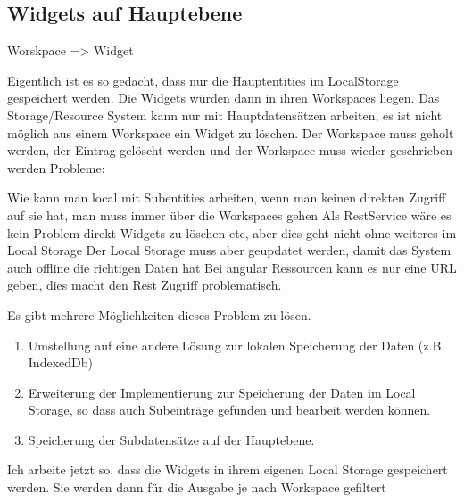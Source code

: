 \subsection{Widgets auf Hauptebene}

Worskpace => Widget

Eigentlich ist es so gedacht, dass nur die Hauptentities im LocalStorage gespeichert werden.
Die Widgets würden dann in ihren Workspaces liegen. Das Storage/Resource System kann nur mit Hauptdatensätzen arbeiten, es ist nicht möglich aus einem Workspace ein Widget zu löschen. Der Workspace muss geholt werden, der Eintrag gelöscht werden und der Workspace muss wieder geschrieben werden
Probleme:

    Wie kann man local mit Subentities arbeiten, wenn man keinen direkten Zugriff auf sie hat, man muss immer über die Workspaces gehen
    Als RestService wäre es kein Problem direkt Widgets zu löschen etc, aber dies geht nicht ohne weiteres im Local Storage
    Der Local Storage muss aber geupdatet werden, damit das System auch offline die richtigen Daten hat
    Bei angular Ressourcen kann es nur eine URL geben, dies macht den Rest Zugriff problematisch.

Es gibt mehrere Möglichkeiten dieses Problem zu lösen.

\begin{enumerate}
 \item Umstellung auf eine andere Lösung zur lokalen Speicherung der Daten (z.B. IndexedDb)
 \item Erweiterung der Implementierung zur Speicherung der Daten im Local Storage, so dass auch Subeinträge gefunden und bearbeit werden können.
 \item Speicherung der Subdatensätze auf der Hauptebene.
\end{enumerate}


    

Ich arbeite jetzt so, dass die Widgets in ihrem eigenen Local Storage gespeichert werden. Sie werden dann für die Ausgabe je nach Workspace gefiltert



